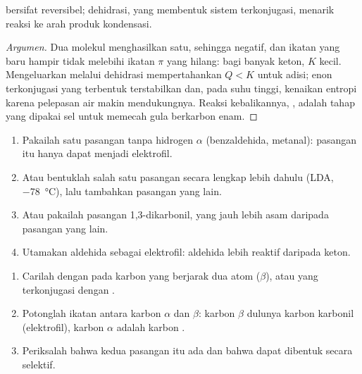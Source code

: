 \begin{proposition}\label{prop:b2:enolates-aldol:aldol-equilibrium}
 bersifat reversibel; dehidrasi, yang membentuk sistem
terkonjugasi, menarik reaksi ke arah produk kondensasi.
\end{proposition}

\begin{proof}[Argumen]
Dua molekul menghasilkan satu, sehingga  negatif, dan
ikatan  yang baru hampir tidak melebihi ikatan $\pi$  yang
hilang: bagi banyak keton, $K$ kecil. Mengeluarkan  melalui dehidrasi
mempertahankan $Q < K$ untuk adisi; enon terkonjugasi yang terbentuk
terstabilkan dan, pada suhu tinggi, kenaikan entropi karena pelepasan air
makin mendukungnya. Reaksi kebalikannya, , adalah tahap yang
dipakai sel untuk memecah gula berkarbon enam.
\end{proof}

\begin{method}\label{met:b2:enolates-aldol:crossed-aldol}
\begin{enumerate}
  \item Pakailah satu pasangan tanpa hidrogen $\alpha$ (benzaldehida,
        metanal): pasangan itu hanya dapat menjadi elektrofil.
  \item Atau bentuklah  salah satu pasangan secara lengkap lebih
        dahulu (LDA, \qty{-78}{\degreeCelsius}), lalu tambahkan pasangan
        yang lain.
  \item Atau pakailah pasangan 1,3-dikarbonil, yang jauh lebih asam daripada
        pasangan yang lain.
  \item Utamakan aldehida sebagai elektrofil: aldehida lebih reaktif daripada keton.
\end{enumerate}
\end{method}

\begin{method}\label{met:b2:enolates-aldol:aldol-recognition}
\begin{enumerate}
  \item Carilah  dengan  pada karbon yang berjarak dua atom ($\beta$), atau 
        yang terkonjugasi dengan .
  \item Potonglah ikatan antara karbon $\alpha$ dan $\beta$: karbon $\beta$
        dulunya karbon karbonil (elektrofil), karbon $\alpha$ adalah karbon
        .
  \item Periksalah bahwa kedua pasangan itu ada dan bahwa  dapat
        dibentuk secara selektif.
\end{enumerate}
\end{method}

